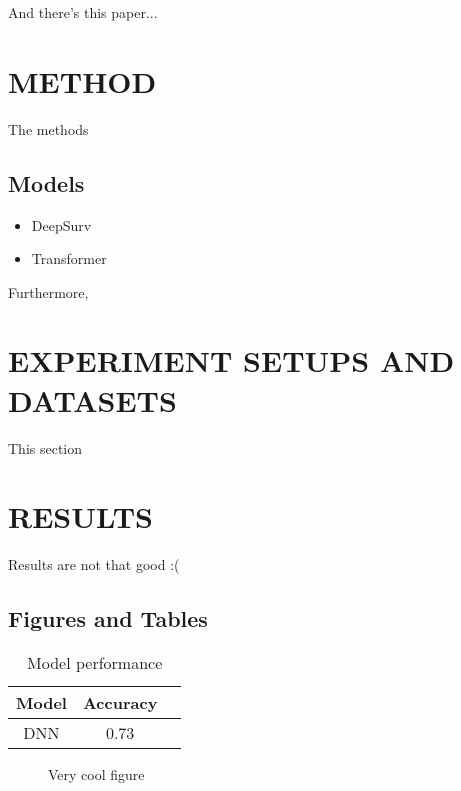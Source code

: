 \documentclass[conference]{ieeeconf}
\begin{document}
And there's this paper...



\section{METHOD}

The methods

\subsection{Models}

\begin{itemize}

\item DeepSurv
\item Transformer

\end{itemize}

Furthermore, 


\section{EXPERIMENT SETUPS AND DATASETS}

This section

\section{RESULTS}

Results are not that good :(

\subsection{Figures and Tables}

\begin{table}[h]
\caption{Model performance}
\label{table_example}
\begin{center}
\begin{tabular}{|c|c|c|}
\hline
Model & Accuracy\\
\hline
DNN & 0.73\\
\hline
\end{tabular}
\end{center}
\end{table}


   \begin{figure}[thpb]
      \centering
      \caption{Very cool figure}
      \label{figurelabel}
   \end{figure}
   
\end{document}

